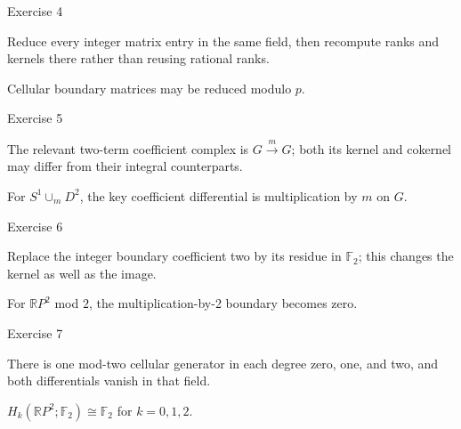 \begin{exercise}\label{exr:viii25-04}
Exercise 4
\end{exercise}
\begin{hint}
Reduce every integer matrix entry in the same field, then recompute ranks and kernels there rather than reusing rational ranks.
\end{hint}
\begin{solution}
Cellular boundary matrices may be reduced modulo \(p\).
\end{solution}

\begin{exercise}\label{exr:viii25-05}
Exercise 5
\end{exercise}
\begin{hint}
The relevant two-term coefficient complex is \(G\xrightarrow{m}G\); both its kernel and cokernel may differ from their integral counterparts.
\end{hint}
\begin{solution}
For \(S^1\cup_mD^2\), the key coefficient differential is multiplication by \(m\) on \(G\).
\end{solution}

\begin{exercise}\label{exr:viii25-06}
Exercise 6
\end{exercise}
\begin{hint}
Replace the integer boundary coefficient two by its residue in \(\mathbb F_2\); this changes the kernel as well as the image.
\end{hint}
\begin{solution}
For \(\mathbb RP^2\) mod \(2\), the multiplication-by-2 boundary becomes zero.
\end{solution}

\begin{exercise}\label{exr:viii25-07}
Exercise 7
\end{exercise}
\begin{hint}
There is one mod-two cellular generator in each degree zero, one, and two, and both differentials vanish in that field.
\end{hint}
\begin{solution}
\(H_k(\mathbb RP^2;\mathbb F_2)\cong\mathbb F_2\) for \(k=0,1,2\).
\end{solution}


